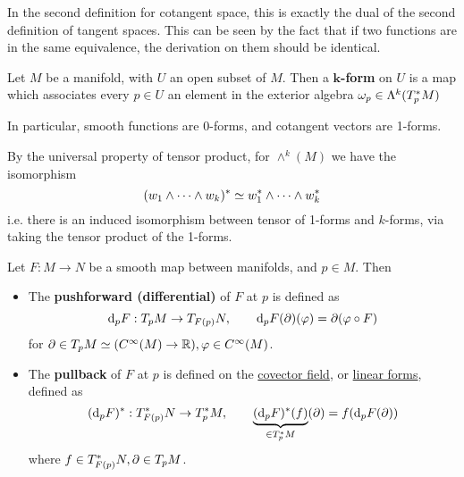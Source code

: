 \documentclass{article}
\begin{document}
\begin{remark}
    In the second definition for cotangent space, this is exactly the dual of the second definition of tangent spaces. This can be seen by the fact that if two functions are in the same equivalence, the derivation on them should be identical.
\end{remark}

\begin{definition}
    Let $M$ be a manifold, with $U$ an open subset of $M$. Then a \textbf{$\bm{k}$-form} on $U$ is a map which associates every $p \in U$ an element in the exterior algebra $\omega_p \in \Lambda^k(T_p^{\ast} M)$
\end{definition}

\begin{remark}
    In particular, smooth functions are 0-forms, and cotangent vectors are 1-forms.
\end{remark}

\begin{remark}
    By the universal property of tensor product, for $\wedge^k(M)$ we have the isomorphism
    \[
        (w_1 \wedge \dots \wedge w_k)^{\ast} \simeq w_1^{\ast} \wedge \dots \wedge w_k^{\ast}
    \]
    i.e. there is an induced isomorphism between tensor of 1-forms and $k$-forms, via taking the tensor product of the 1-forms.
\end{remark}

\begin{definition}
    Let $F: M \to N$ be a smooth map between manifolds, and $p \in M$. Then
    \begin{itemize}
        \item The \textbf{pushforward (differential)} of $F$ at $p$ is defined as
        \[
            \mathrm{d}_p F: T_p M \to T_{F(p)} N, \qquad \mathrm{d}_p F (\partial) (\varphi) = \partial(\varphi \circ F)
        \]
        for $\partial \in T_p M \simeq (C^{\infty}(M) \to \mathbb{R}), \varphi \in C^{\infty}(M)$.
        \item The \textbf{pullback} of $F$ at $p$ is defined on the \underline{covector field}, or \underline{linear forms}, defined as 
        \[
            (\mathrm{d}_p F)^{\ast}: T_{F(p)}^{\ast}N \to T_p^{\ast} M, \qquad \underbrace{(\mathrm{d}_p F)^{\ast}(f)}_{\in T_p^{\ast}M}(\partial) = f(\mathrm{d}_p F(\partial))
        \]
        where $f \in T_{F(p)}^{\ast} N, \partial \in T_p M$.
    \end{itemize}
\end{definition}
\end{document}
